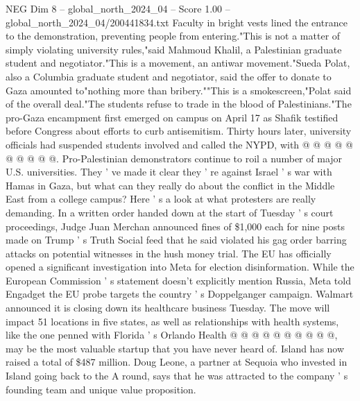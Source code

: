 \begin{textsample}{NEG Dim 8 – global\_north\_2024\_04 – Score 1.00 – global\_north\_2024\_04/200441834.txt}
Faculty in bright vests lined the entrance to the demonstration, preventing people from entering."This is not a matter of simply violating university rules,"said Mahmoud Khalil, a Palestinian graduate student and negotiator."This is a movement, an antiwar movement."Sueda Polat, also a Columbia graduate student and negotiator, said the offer to donate to Gaza amounted to"nothing more than bribery.""This is a smokescreen,"Polat said of the overall deal."The students refuse to trade in the blood of Palestinians."The pro-Gaza encampment first emerged on campus on April 17 as Shafik testified before Congress about efforts to curb antisemitism.
Thirty hours later, university officials had suspended students involved and called the NYPD, with @ @ @ @ @ @ @ @ @ @.
Pro-Palestinian demonstrators continue to roil a number of major U.S. universities.
They ' ve made it clear they ' re against Israel ' s war with Hamas in Gaza, but what can they really do about the conflict in the Middle East from a college campus?
Here ' s a look at what protesters are really demanding.
In a written order handed down at the start of Tuesday ' s court proceedings, Judge Juan Merchan announced fines of \$1,000 each for nine posts made on Trump ' s Truth Social feed that he said violated his gag order barring attacks on potential witnesses in the hush money trial.
The EU has officially opened a significant investigation into Meta for election disinformation.
While the European Commission ' s statement doesn't explicitly mention Russia, Meta told Engadget the EU probe targets the country ' s Doppelganger campaign.
Walmart announced it is closing down its healthcare business Tuesday.
The move will impact 51 locations in five states, as well as relationships with health systems, like the one penned with Florida ' s Orlando Health @ @ @ @ @ @ @ @ @ @, may be the most valuable startup that you have never heard of.
Island has now raised a total of \$487 million.
Doug Leone, a partner at Sequoia who invested in Island going back to the A round, says that he was attracted to the company ' s founding team and unique value proposition.

\end{textsample}

